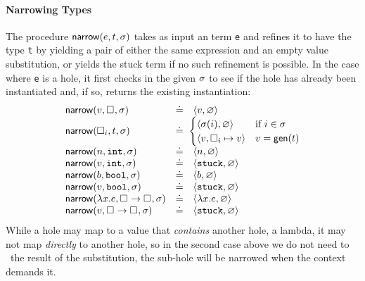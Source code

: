 \paragraph{Narrowing Types} The procedure $\mathsf{narrow}(e, t, \sigma)$ takes as
input an term \texttt{e} and refines it to have the type \texttt{t} by
yielding a pair of either the same expression and an empty value
substitution, or yields the stuck term if no such refinement is
possible. In the case where \texttt{e} is a hole, it first checks in the
given $\sigma$ to see if the hole has already been instantiated and, if
so, returns the existing instantiation:
%
$$
\begin{array}{lcl}
\mathsf{narrow}(v, \square_{}, \sigma)  & \doteq & \langle v, \varnothing \rangle \\
\mathsf{narrow}(\square_{i}, t, \sigma) & \doteq & \hspace{-1ex}
\begin{cases}
  \langle \sigma(i), \varnothing \rangle        & \mbox{if}\ i \in \sigma \\
  \langle v, \square_{i} \mapsto v \rangle   & v = \mathsf{gen}(t)\\
\end{cases} \\
\mathsf{narrow}(n, \mathtt{int}, \sigma)     & \doteq & \langle n, \varnothing \rangle \\
\mathsf{narrow}(v, \mathtt{int}, \sigma)     & \doteq & \langle \mathtt{stuck}, \varnothing \rangle \\
\mathsf{narrow}(b, \mathtt{bool}, \sigma)    & \doteq & \langle b, \varnothing \rangle \\
\mathsf{narrow}(v, \mathtt{bool}, \sigma)    & \doteq & \langle \mathtt{stuck}, \varnothing \rangle \\
\mathsf{narrow}(\lambda x. e, {\square_{}} \rightarrow \square_{}, \sigma) & \doteq & \langle \lambda x. e, \varnothing \rangle \\
\mathsf{narrow}(v, {\square_{}} \rightarrow \square_{}, \sigma) & \doteq & \langle \mathtt{stuck}, \varnothing \rangle \\
\end{array}
$$
%
While a hole may map to a value that \emph{contains} another hole, \eg a
lambda, it may not map \emph{directly} to another hole, so in the second
case above we do not need to \forcesym\ the result of the substitution,
the sub-hole will be narrowed when the context demands it.

